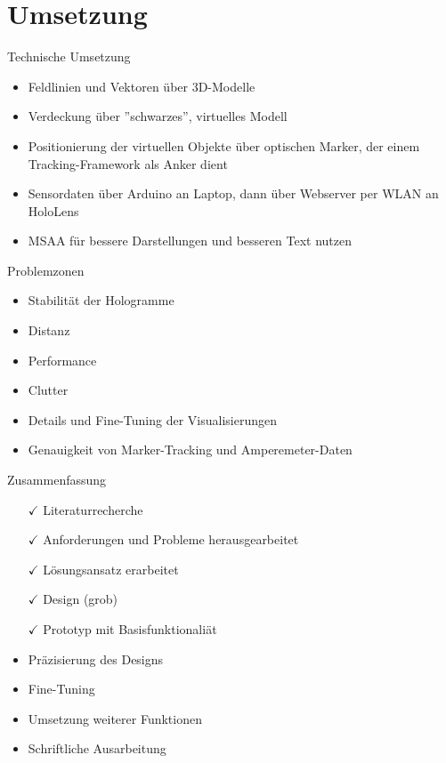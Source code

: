 \part{Umsetzung}
\label{part:practice}
\begin{frame}[fragile]{Technische Umsetzung}
\begin{itemize}
	\item Feldlinien und Vektoren über 3D-Modelle
	\item Verdeckung über ''schwarzes'', virtuelles Modell
	\item Positionierung der virtuellen Objekte über optischen Marker, der einem Tracking-Framework als Anker dient
	\item Sensordaten über Arduino an Laptop, dann über Webserver per WLAN an HoloLens
	\item MSAA für bessere Darstellungen und besseren Text nutzen
\end{itemize}
\end{frame}

\begin{frame}[fragile]{Problemzonen}
\begin{itemize}
	\item Stabilität der Hologramme
	\item Distanz
	\item Performance
	\item Clutter
	\item Details und Fine-Tuning der Visualisierungen
	\item Genauigkeit von Marker-Tracking und Amperemeter-Daten
\end{itemize}
\end{frame}

\begin{frame}[fragile]{Zusammenfassung}
\begin{itemize}
	\item[$\checkmark$] Literaturrecherche
	\item[$\checkmark$] Anforderungen und Probleme herausgearbeitet
	\item[$\checkmark$] Lösungsansatz erarbeitet
	\item[$\checkmark$] Design (grob)
	\item[$\checkmark$] Prototyp mit Basisfunktionaliät
	\item Präzisierung des Designs
	\item Fine-Tuning
	\item Umsetzung weiterer Funktionen
	\item Schriftliche Ausarbeitung
\end{itemize}
\end{frame}

